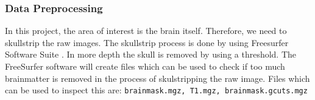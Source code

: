 \documentclass[12pt, fleqn, titlepage]{article}
\begin{document}



\subsubsection{Data Preprocessing}

In this project, the area of interest is the brain itself. 
Therefore, we need to skullstrip the raw images.
The skullstrip process is done by using Freesurfer Software Suite \cite{freesurfer}.
In more depth the skull is removed by using a threshold.
The FreeSurfer software will create files which can be used to check if too much brainmatter is removed in the process of skulstripping the raw image.
Files which can be used to inspect this are: \texttt{brainmask.mgz, T1.mgz, brainmask.gcuts.mgz}
\end{document}
